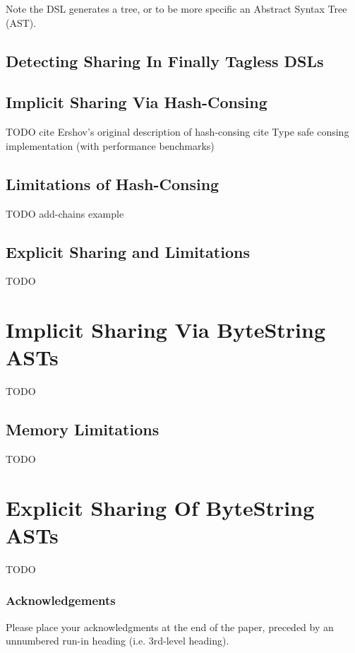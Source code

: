 \documentclass[runningheads]{llncs}
\begin{document}
Note the DSL generates a tree, or to be more specific an Abstract Syntax Tree
(AST).

\subsection{Detecting Sharing In Finally Tagless DSLs}


\subsection{Implicit Sharing Via Hash-Consing}
TODO
cite Ershov’s original description of hash-consing \cite{ershov1958:consing}
cite Type safe consing implementation (with performance benchmarks) \cite{filliatre:typesafeconsing}

\subsection{Limitations of Hash-Consing}

TODO add-chains example

\subsection{Explicit Sharing and Limitations}
TODO

\section{Implicit Sharing Via ByteString ASTs}
TODO

\subsection{Memory Limitations}
TODO
\section{Explicit Sharing Of ByteString ASTs}
TODO

\subsubsection{Acknowledgements} Please place your acknowledgments at
the end of the paper, preceded by an unnumbered run-in heading (i.e.
3rd-level heading).

%
%


\end{document}
